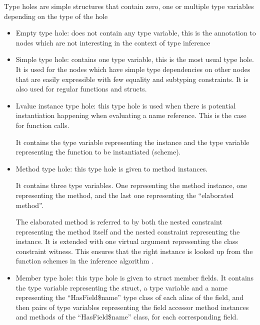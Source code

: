 \begin{defn}
    Type holes are simple structures that contain zero, one or multiple type variables depending on the type of the hole

    \begin{itemize}
        \item Empty type hole: does not contain any type variable, this is the annotation to nodes which are not interesting in the context of type inference 

        \item Simple type hole: contains one type variable, this is the most usual type hole. It is used for the nodes which have simple type dependencies on other nodes that are easily expressible with few equality and subtyping constraints. It is also used for regular functions and structs.

        \item Lvalue instance type hole: this type hole is used when there is potential instantiation happening when evaluating a name reference. This is the case for function calls.

        It contains the type variable representing the instance and the type variable representing the function to be instantiated (scheme).

        \item Method type hole: this type hole is given to method instances.

        It contains three type variables. One representing the method instance, one representing the method, and the last one representing the ``elaborated method''.

        The elaborated method is referred to by both the nested constraint representing the method itself and the nested constraint representing the instance. It is extended with one virtual argument representing the class constraint witness. This ensures that the right instance is looked up from the function schemes in the inference algorithm .

        \item Member type hole: this type hole is given to struct member fields. It contains the type variable representing the struct, a type variable and a name representing the ``HasField\$name'' type class of each alias of the field, and then pairs of type variables representing the field accessor method instances and methods of the  ``HasField\$name'' class, for each corresponding field.
    \end{itemize}
\end{defn}

